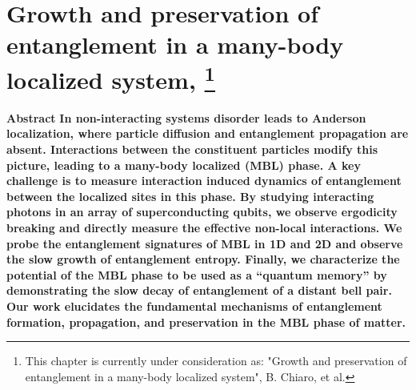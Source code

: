 %
\chapter[Growth and preservation of entanglement in a many-body localized system]{Growth and preservation of entanglement in a many-body localized system,
\footnote{This chapter is currently under consideration as: "Growth and preservation of entanglement in a many-body localized system", B. Chiaro, et al.}}
\label{ch:MBL}


{\textbf{\centering Abstract}}
\textbf{In non-interacting systems disorder leads to Anderson localization, where particle diffusion and entanglement propagation are absent.
Interactions between the constituent particles modify this picture, leading to a many-body localized (MBL) phase.
A key challenge is to measure interaction induced dynamics of entanglement between the localized sites in this phase.
By studying interacting photons in an array of superconducting qubits, we observe ergodicity breaking and directly measure the effective non-local interactions.
We probe the entanglement signatures of MBL in 1D and 2D and observe the slow growth of entanglement entropy.
Finally, we characterize the potential of the MBL phase to be used as a “quantum memory” by demonstrating the slow decay of entanglement of a distant bell pair.
Our work elucidates the fundamental mechanisms of entanglement formation, propagation, and preservation in the MBL phase of matter.}

